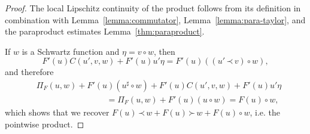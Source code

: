 \documentclass[a4paper,11pt]{article}
\newcommand{\cdummy}{\cdot}
\theoremstyle{remark}
\newcommand{\lpara}{\,\mathord{\prec}\,}
\newcommand{\rpara}{\,\mathord{\succ}\,}
\newcommand{\reso}{\,\mathord{\circ}\,}
\begin{document}
\begin{proof}
  The local Lipschitz continuity of the product follows from its definition in
  combination with Lemma~\ref{lemma:commutator},
  Lemma~\ref{lemma:para-taylor}, and the paraproduct estimates
  Lemma~\ref{thm:paraproduct}. %
 
  If $w$ is a Schwartz function and $\eta = v \reso w$, then
  \[
     F'(u) C(u', v, w) + F'(u) u' \eta = F'(u) ((u'\lpara v) \reso w),
  \]
  and therefore
  \begin{align*}
     &\Pi_{F} ( u,w ) +F' ( u ) ( u^{\sharp} \reso w ) +F' ( u ) C ( u' ,v,w ) +F' ( u ) u' \eta \\
     &\hspace{100pt} = \Pi_{F} ( u,w ) +F' ( u ) ( u \reso w ) =F ( u ) \reso w,
  \end{align*}
  which shows that we recover $F(u) \lpara w + F(u) \rpara w + F(u) \reso w$, i.e. the pointwise product.
  

\end{proof}
\end{document}
